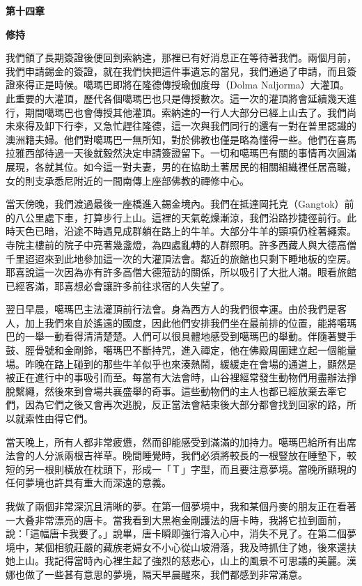 \textbf{第十四章}

\textbf{修持}

我們領了長期簽證後便回到索納達，那裡已有好消息正在等待著我們。兩個月前，我們申請錫金的簽證，就在我們快把這件事遺忘的當兒，我們通過了申請，而且簽證來得正是時候。噶瑪巴即將在隆德傳授瑜伽度母（Dolma
Naljorma）大灌頂。此重要的大灌頂，歷代各個噶瑪巴也只是傳授數次。這一次的灌頂將會延續幾天進行，期間噶瑪巴也會傳授其他灌頂。索納達的一行人大部分已經上山去了。我們尚未來得及卸下行李，又急忙趕往隆德，這一次與我們同行的還有一對在普里認識的澳洲籍夫婦。他們對噶瑪巴一無所知，對於佛教也僅是略為懂得一些。他們在喜馬拉雅西部待過一天後就毅然決定申請簽證留下。一切和噶瑪巴有關的事情再次圓滿展現，各就其位。如今這一對夫妻，男的在協助土著居民的相關組織裡任居高職，女的則支承悉尼附近的一間南傳上座部佛教的禪修中心。

當天傍晚，我們渡過最後一座橋進入錫金境內。我們在抵達岡托克（Gangtok）前的八公里處下車，打算步行上山。這裡的天氣乾燥漸涼，我們沿路抄捷徑前行。此時天色已暗，沿途不時遇見成群躺在路上的牛羊。大部分牛羊的頸項仍栓著繩索。寺院主樓前的院子中亮著幾盞燈，為四處亂轉的人群照明。許多西藏人與大德高僧千里迢迢來到此地參加這一次的大灌頂法會。鄰近的旅館也只剩下睡地板的空房。耶喜說這一次因為亦有許多高僧大德蒞訪的關係，所以吸引了大批人潮。眼看旅館已經客滿，耶喜想必會讓許多前往求宿的人失望了。

翌日早晨，噶瑪巴主法灌頂前行法會。身為西方人的我們很幸運。由於我們是客人，加上我們來自於遙遠的國度，因此他們安排我們坐在最前排的位置，能將噶瑪巴的一舉一動看得清清楚楚。人們可以很具體地感受到噶瑪巴的舉動。伴隨著雙手鼓、脛骨號和金剛鈴，噶瑪巴不斷持咒，進入禪定，他在佛殿周圍建立起一個能量場。昨晚在路上碰到的那些牛羊似乎也來湊熱鬧，緩緩走在會場的通道上，顯然是被正在進行中的事吸引而至。每當有大法會時，山谷裡經常發生動物們用盡辦法掙脫繫繩，然後來到會場共襄盛舉的奇事。這些動物們的主人也都已經放棄去牽它們，因為它們之後又會再次逃脫，反正當法會結束後大部分都會找到回家的路，所以就索性由得它們。

當天晚上，所有人都非常疲憊，然而卻能感受到滿滿的加持力。噶瑪巴給所有出席法會的人分派兩根吉祥草。晚間睡覺時，我們必須將較長的一根豎放在睡墊下，較短的另一根則橫放在枕頭下，形成一「Ｔ」字型，而且要注意夢境。當晚所顯現的任何夢境也許具有重大而深遠的意義。

我做了兩個非常深沉且清晰的夢。在第一個夢境中，我和某個丹麥的朋友正在看著一大叠非常漂亮的唐卡。當我看到大黑袍金剛護法的唐卡時，我將它拉到面前，說：「這幅唐卡我要了。」說畢，唐卡瞬即強行溶入心中，消失不見了。在第二個夢境中，某個相貌莊嚴的藏族老婦女不小心從山坡滑落，我及時抓住了她，後來還扶她上山。我記得當時內心裡生起了強烈的慈悲心，山上的風景不可思議的美麗。漢娜也做了一些甚有意思的夢境，隔天早晨醒來，我們都感到非常滿意。

